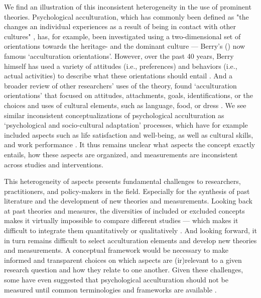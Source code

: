 \documentclass[man, 12pt, a4paper]{apa7}
\begin{document}
We find an illustration of this inconsistent heterogeneity in the use of prominent theories. Psychological acculturation, which has commonly been defined as "the changes an individual experiences as a result of being in contact with other cultures" \citep[][p. 14]{Sam2006b}, has, for example, been investigated using a two-dimensional set of orientations towards the heritage- and the dominant culture --- Berry's (\citeyear{Berry1980, Berry1997b, Berry2005}) now famous `acculturation orientations'. However, over the past 40 years, Berry himself has used a variety of attitudes (i.e., preferences) and behaviors (i.e., actual activities) to describe what these orientations should entail \citep{Berry2005}. And a broader review of other researchers' uses of the theory, found `acculturation orientations' that focused on attitudes, attachments, goals, identifications, or the choices and uses of cultural elements, such as language, food, or dress \citep[e.g.,][]{Rudmin2003a}. We see similar inconsistent conceptualizations of psychological acculturation as `psychological and socio-cultural adaptation' processes, which have for example included aspects such as life satisfaction and well-being, as well as cultural skills, and work performance \citep{Searle1990, Ward2001, Berry2003}.
It thus remains unclear what aspects the concept exactly entails, how these aspects are organized, and measurements are inconsistent across studies and interventions.

This heterogeneity of aspects presents fundamental challenges to researchers, practitioners, and policy-makers in the field. Especially for the synthesis of past literature and the development of new theories and measurements.
Looking back at past theories and measures, the diversities of included or excluded concepts makes it virtually impossible to compare different studies --- which makes it difficult to integrate them quantitatively or qualitatively \citep{Taft1981}.
And looking forward, it in turn remains difficult to select acculturation elements and develop new theories and measurements. A conceptual framework would be necessary to make informed and transparent choices on which aspects are (ir)relevant to a given research question and how they relate to one another.
Given these challenges, some have even suggested that psychological acculturation should not be measured until common terminologies and frameworks are available \citep{Escobar2000}.
\end{document}
